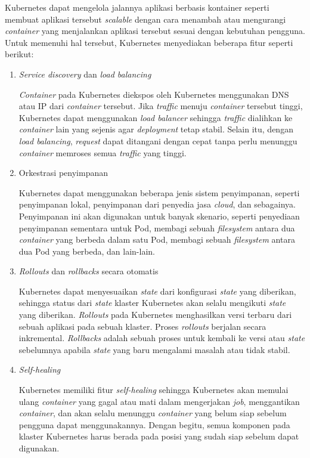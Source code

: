 Kubernetes dapat mengelola jalannya aplikasi berbasis kontainer seperti membuat
aplikasi tersebut \emph{scalable} dengan cara menambah atau mengurangi \emph{container}
yang menjalankan aplikasi tersebut sesuai dengan kebutuhan pengguna. Untuk memenuhi
hal tersebut, Kubernetes menyediakan beberapa fitur seperti berikut:

\begin{enumerate}

  \item \emph{Service discovery} dan \emph{load balancing}

    \emph{Container} pada Kubernetes diekspos oleh Kubernetes menggunakan DNS atau IP dari
    \emph{container} tersebut. Jika \emph{traffic} menuju \emph{container} tersebut tinggi, Kubernetes
    dapat menggunakan \emph{load balancer} sehingga \emph{traffic} dialihkan ke \emph{container} lain yang sejenis
    agar \emph{deployment} tetap stabil. Selain itu, dengan \emph{load balancing}, \emph{request} dapat ditangani
    dengan cepat tanpa perlu menunggu \emph{container} memroses semua \emph{traffic}
    yang tinggi.

  \item{Orkestrasi penyimpanan}

    Kubernetes dapat menggunakan beberapa jenis sistem penyimpanan, seperti
    penyimpanan lokal, penyimpanan dari penyedia jasa \emph{cloud}, dan sebagainya.
    Penyimpanan ini akan digunakan untuk banyak skenario, seperti penyediaan penyimpanan
    sementara untuk Pod, membagi sebuah \emph{filesystem} antara dua \emph{container}
    yang berbeda dalam satu Pod, membagi sebuah \emph{filesystem} antara dua Pod yang
    berbeda, dan lain-lain.

  \item \emph{Rollouts} dan \emph{rollbacks} secara otomatis

    Kubernetes dapat menyesuaikan \emph{state} dari konfigurasi \emph{state} yang
    diberikan, sehingga status dari \emph{state} klaster Kubernetes akan selalu mengikuti
    \emph{state} yang diberikan. \emph{Rollouts} pada Kubernetes menghasilkan versi terbaru
    dari sebuah aplikasi pada sebuah klaster. Proses \emph{rollouts} berjalan secara inkremental.
    \emph{Rollbacks} adalah sebuah proses untuk kembali ke versi atau \emph{state} sebelumnya apabila
    \emph{state} yang baru mengalami masalah atau tidak stabil.
    

  \item \emph{Self-healing}

    Kubernetes memiliki fitur \emph{self-healing} sehingga Kubernetes
    akan memulai ulang \emph{container} yang gagal atau mati dalam
    mengerjakan \emph{job}, menggantikan \emph{container}, dan akan selalu menunggu
    \emph{container} yang belum siap sebelum pengguna dapat menggunakannya. Dengan begitu,
    semua komponen pada klaster Kubernetes harus berada pada posisi yang sudah siap
    sebelum dapat digunakan.


\end{enumerate}
